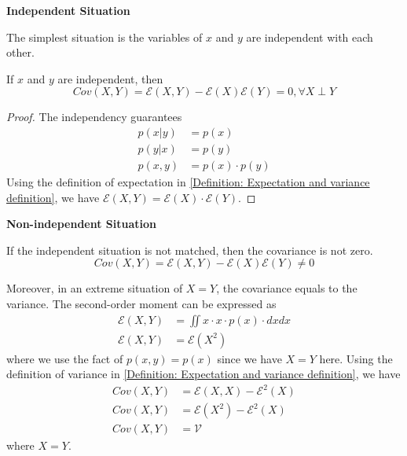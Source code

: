 \documentclass[../main.tex]{subfiles}
\begin{document}
\bigbreak
\textbf{Independent Situation}

The simplest situation is the variables of $x$ and $y$ are independent with each other.
\begin{lemma}
    \label{Lemma: Mixed second-order moment of independent variables}
    If $x$ and $y$ are independent, then
    \begin{equation*}
        Cov(X, Y) =
        \mathcal{E}(X, Y) - \mathcal{E}(X) \mathcal{E}(Y) = 0,
        \forall X \perp Y
    \end{equation*}
    \begin{proof}
        The independency guarantees
        \begin{align*}
            p(x|y)  & = p(x)            \\
            p(y|x)  & = p(y)            \\
            p(x, y) & = p(x) \cdot p(y)
        \end{align*}
        Using the definition of expectation in \eqref{Definition: Expectation and variance definition},
        we have $\mathcal{E}(X, Y) = \mathcal{E}(X) \cdot \mathcal{E}(Y)$.
    \end{proof}
\end{lemma}

\bigbreak
\textbf{Non-independent Situation}

If the independent situation is not matched, then the covariance is not zero.
\begin{equation*}
    Cov(X, Y) =
    \mathcal{E}(X, Y) - \mathcal{E}(X)\mathcal{E}(Y)
    \neq 0
\end{equation*}

Moreover, in an extreme situation of $X=Y$, the covariance equals to the variance.
The second-order moment can be expressed as
\begin{align*}
    \mathcal{E}(X, Y) & = \iint x \cdot x \cdot p(x) \cdot dx dx \\
    \mathcal{E}(X, Y) & = \mathcal{E}(X^2)
\end{align*}
where we use the fact of $p(x, y) = p(x)$ since we have $X=Y$ here.
Using the definition of variance in \eqref{Definition: Expectation and variance definition}, we have
\begin{align*}
    Cov(X, Y) & = \mathcal{E}(X, X) - \mathcal{E}^2(X) \\
    Cov(X, Y) & = \mathcal{E}(X^2) - \mathcal{E}^2(X)  \\
    Cov(X, Y) & = \mathcal{V}
\end{align*}
where $X=Y$.
\end{document}
